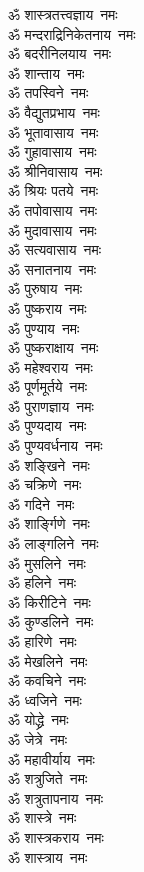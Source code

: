 \begin{multicols}{2}
\begin{flushleft}
ॐ शास्त्रतत्त्वज्ञाय~नमः\\
ॐ मन्दराद्रिनिकेतनाय~नमः\\
ॐ बदरीनिलयाय~नमः\\
ॐ शान्ताय~नमः\\
ॐ तपस्विने~नमः\\
ॐ वैद्युतप्रभाय~नमः\\
ॐ भूतावासाय~नमः\\
ॐ गुहावासाय~नमः\\
ॐ श्रीनिवासाय~नमः\\
ॐ श्रियः पतये~नमः\hfill{}\\
ॐ तपोवासाय~नमः\\
ॐ मुदावासाय~नमः\\
ॐ सत्यवासाय~नमः\\
ॐ सनातनाय~नमः\\
ॐ पुरुषाय~नमः\\
ॐ पुष्कराय~नमः\\
ॐ पुण्याय~नमः\\
ॐ पुष्कराक्षाय~नमः\\
ॐ महेश्वराय~नमः\\
ॐ पूर्णमूर्तये~नमः\hfill{}\\
ॐ पुराणज्ञाय~नमः\\
ॐ पुण्यदाय~नमः\\
ॐ पुण्यवर्धनाय~नमः\\
ॐ शङ्खिने~नमः\\
ॐ चक्रिणे~नमः\\
ॐ गदिने~नमः\\
ॐ शार्ङ्गिणे~नमः\\
ॐ लाङ्गलिने~नमः\\
ॐ मुसलिने~नमः\\
ॐ हलिने~नमः\hfill{}\\
ॐ किरीटिने~नमः\\
ॐ कुण्डलिने~नमः\\
ॐ हारिणे~नमः\\
ॐ मेखलिने~नमः\\
ॐ कवचिने~नमः\\
ॐ ध्वजिने~नमः\\
ॐ योद्ध्रे~नमः\\
ॐ जेत्रे~नमः\\
ॐ महावीर्याय~नमः\\
ॐ शत्रुजिते~नमः\hfill{}\\
ॐ शत्रुतापनाय~नमः\\
ॐ शास्त्रे~नमः\\
ॐ शास्त्रकराय~नमः\\
ॐ शास्त्राय~नमः\\

\end{flushleft}
\end{multicols}
